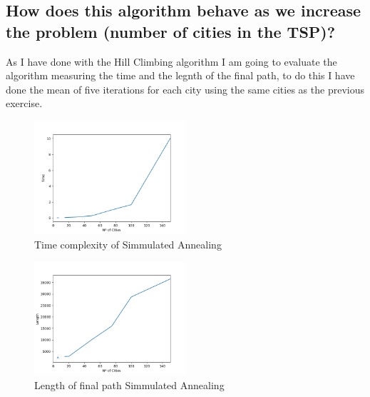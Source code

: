 \documentclass{article}
\begin{document}
        \subsection{How does this algorithm behave as we increase the problem (number of cities in
    the TSP)?}

        As I have done with the Hill Climbing algorithm I am going to evaluate the algorithm measuring the time and the legnth of the final path, to do this I 
        have done the mean of five iterations for each city using the same cities as the previous exercise.

        \begin{figure}[H]

            \centering
            \includegraphics[width=0.5\textwidth]{../media/01.SimAnnealing-time.png}
            \caption{Time complexity of Simmulated Annealing}
            \label{Time complexity of Simmulated Annealing}

        \end{figure}

        \begin{figure}[H]

            \centering
            \includegraphics[width=0.5\textwidth]{../media/02.SimAnnealing-length.png}
            \caption{Length of final path Simmulated Annealing}
            \label{Length of final path Simmulated Annealing}

        \end{figure}
\end{document}
